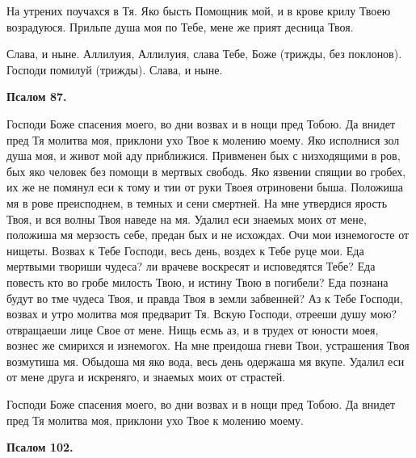 На утрених поучахся в Тя. Яко бысть Помощник мой, и в крове крилу Твоею возрадуюся. Прильпе душа моя по Тебе, мене же прият десница Твоя. 

Слава, и ныне. Аллилуия, Аллилуия, слава Тебе, Боже (трижды, без поклонов). Господи помилуй (трижды). Слава, и ныне.


\medskip


\bfseries Псалом 87.\normalfont{}


Господи Боже спасения моего, во дни возвах и в нощи пред Тобою. Да внидет пред Тя молитва моя, приклони ухо Твое к молению моему. Яко исполнися зол душа моя, и живот мой аду приближися. Привменен бых с низходящими в ров, бых яко человек без помощи в мертвых свободь. Яко язвении спящии во гробех, их же не помянул еси к тому и тии от руки Твоея отриновени быша. Положиша мя в рове преисподнем, в темных и сени смертней. На мне утвердися ярость Твоя, и вся волны Твоя наведе на мя. Удалил еси знаемых моих от мене, положиша мя мерзость себе, предан бых и не исхождах. Очи мои изнемогосте от нищеты. Возвах к Тебе Господи, весь день, воздех к Тебе руце мои. Еда мертвыми твориши чудеса? ли врачеве воскресят и исповедятся Тебе? Еда повесть кто во гробе милость Твою, и истину Твою в погибели? Еда познана будут во тме чудеса Твоя, и правда Твоя в земли забвенней? Аз к Тебе Господи, возвах и утро молитва моя предварит Тя. Вскую Господи, отрееши душу мою? отвращаеши лице Свое от мене. Нищь есмь аз, и в трудех от юности моея, вознес же смирихся и изнемогох. На мне преидоша гневи Твои, устрашения Твоя возмутиша мя. Обыдоша мя яко вода, весь день одержаша мя вкупе. Удалил еси от мене друга и искреняго, и знаемых моих от страстей.

Господи Боже спасения моего, во дни возвах и в нощи пред Тобою. Да внидет пред Тя молитва моя, приклони ухо Твое к молению моему.


\medskip


\bfseries Псалом 102.\normalfont{}



